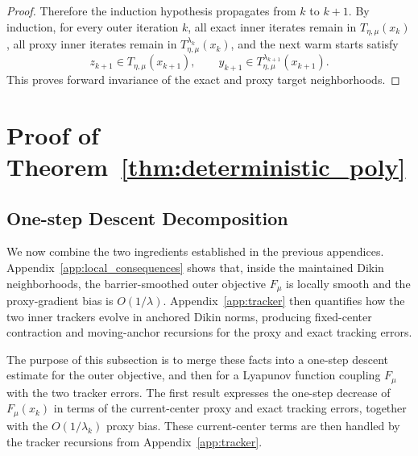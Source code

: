 \documentclass{article}
\begin{document}
\begin{proof}
Therefore the induction hypothesis propagates from \(k\) to \(k+1\). By induction, for every outer
iteration \(k\), all exact inner iterates remain in \(T_{\eta,\mu}(x_k)\), all proxy inner iterates
remain in \(T_{\eta,\mu}^{\lambda_k}(x_k)\), and the next warm starts satisfy
\[
z_{k+1}\in T_{\eta,\mu}(x_{k+1}),
\qquad
y_{k+1}\in T_{\eta,\mu}^{\lambda_{k+1}}(x_{k+1}).
\]
This proves forward invariance of the exact and proxy target neighborhoods.
\end{proof}



\section{Proof of Theorem~\ref{thm:deterministic_poly}}
\label{app:deterministic}


\subsection{One-step Descent Decomposition}
\label{app:one_step_descent}

We now combine the two ingredients established in the previous appendices.
Appendix~\ref{app:local_consequences} shows that, inside the maintained Dikin neighborhoods, the barrier-smoothed
outer objective \(F_\mu\) is locally smooth and the proxy-gradient bias is \(O(1/\lambda)\).
Appendix~\ref{app:tracker} then quantifies how the two inner trackers evolve in anchored Dikin
norms, producing fixed-center contraction and moving-anchor recursions for the proxy and exact
tracking errors.

The purpose of this subsection is to merge these facts into a one-step descent estimate for the outer
objective, and then for a Lyapunov function coupling \(F_\mu\) with the two tracker errors. The first
result expresses the one-step decrease of \(F_\mu(x_k)\) in terms of the current-center proxy and
exact tracking errors, together with the \(O(1/\lambda_k)\) proxy bias. These current-center terms are
then handled by the tracker recursions from Appendix~\ref{app:tracker}.
\end{document}
